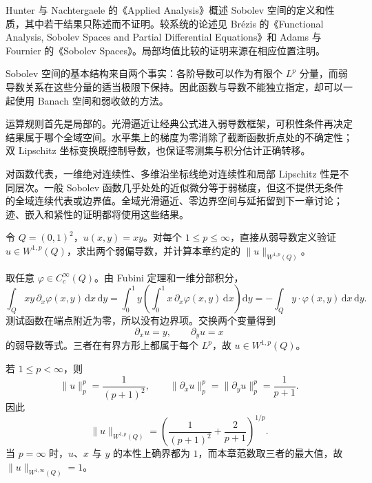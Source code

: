 \ProseParagraphBreak

Hunter 与 Nachtergaele 的《Applied Analysis》\cite[Sections 12.9--12.10]{Hunter2001Applied}概述 Sobolev 空间的定义和性质，其中若干结果只陈述而不证明。较系统的论述见 Brézis 的《Functional Analysis, Sobolev Spaces and Partial Differential Equations》\cite{Brezis2011Functional}和 Adams 与 Fournier 的《Sobolev Spaces》\cite{Adams2003Sobolev}。局部均值比较的证明来源在相应位置注明。





\begin{chaptersummary}
Sobolev 空间的基本结构来自两个事实：各阶导数可以作为有限个 \(L^p\) 分量，而弱导数关系在这些分量的适当极限下保持。因此函数与导数不能独立指定，却可以一起使用 Banach 空间和弱收敛的方法。

\ProseParagraphBreak

运算规则首先是局部的。光滑逼近让经典公式进入弱导数框架，可积性条件再决定结果属于哪个全域空间。水平集上的梯度为零消除了截断函数折点处的不确定性；双 Lipschitz 坐标变换既控制导数，也保证零测集与积分估计正确转移。

\ProseParagraphBreak

对函数代表，一维绝对连续性、多维沿坐标线绝对连续性和局部 Lipschitz 性是不同层次。一般 Sobolev 函数几乎处处的近似微分等于弱梯度，但这不提供无条件的全域连续代表或边界值。全域光滑逼近、零边界空间与延拓留到下一章讨论；迹、嵌入和紧性的证明都将使用这些结果。
\end{chaptersummary}


\BookExercises


\begin{exercise}\label{b1:ex:21-basic-definition-norm}
令 \(Q=(0,1)^2\)，\(u(x,y)=xy\)。对每个 \(1\leq p\leq\infty\)，直接从弱导数定义验证 \(u\in W^{1,p}(Q)\)，求出两个弱偏导数，并计算本章约定的 \(\|u\|_{W^{1,p}(Q)}\)。
\end{exercise}
\begin{solution}
取任意 \(\varphi\in C_c^\infty(Q)\)。由 Fubini 定理和一维分部积分，
\[
 \int_Qxy\,\partial_x\varphi(x,y)\,\mathrm dx\,\mathrm dy
 =\int_0^1y\left(\int_0^1x\,\partial_x\varphi(x,y)\,\mathrm dx\right)\mathrm dy
 =-\int_Qy\cdot \varphi(x,y)\,\mathrm dx\,\mathrm dy.
\]
测试函数在端点附近为零，所以没有边界项。交换两个变量得到
\[
 \partial_xu=y,\qquad \partial_yu=x
\]
的弱导数等式。三者在有界方形上都属于每个 \(L^p\)，故 \(u\in W^{1,p}(Q)\)。

若 \(1\leq p<\infty\)，则
\[
 \|u\|_p^p=\frac1{(p+1)^2},\qquad
 \|\partial_xu\|_p^p=\|\partial_yu\|_p^p=\frac1{p+1}.
\]
因此
\[
 \|u\|_{W^{1,p}(Q)}
 =\left(\frac1{(p+1)^2}+\frac2{p+1}\right)^{1/p}.
\]
当 \(p=\infty\) 时，\(u\)、\(x\) 与 \(y\) 的本性上确界都为 \(1\)，而本章范数取三者的最大值，故 \(\|u\|_{W^{1,\infty}(Q)}=1\)。
\end{solution}

